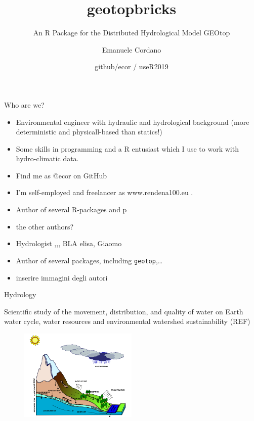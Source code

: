 \documentclass[ignorenonframetext,]{beamer}
\title{geotopbricks}
\subtitle{An R Package for the Distributed Hydrological Model GEOtop}
\author{Emanuele Cordano}
\date{github/ecor / useR2019}
\providecommand{\tightlist}{%
  \setlength{\itemsep}{0pt}\setlength{\parskip}{0pt}}
\begin{document}
\frame{\titlepage}

\begin{frame}[fragile]{Who are we?}

\begin{itemize}
\tightlist
\item
  Environmental engineer with hydraulic and hydrological background
  (more deterministic and physicall-based than statics!)
\item
  Some skills in programming and a R entusiast which I use to work with
  hydro-climatic data.
\item
  Find me as @ecor on GitHub
\item
  I'm self-employed and freelancer as www.rendena100.eu .\\
\item
  Author of several R-packages and p
\item
  the other authors?
\item
  Hydrologist ,,, BLA elisa, Giaomo
\item
  Author of several packages, including \texttt{geotop},\ldots{}
\item
  inserire immagini degli autori
\end{itemize}

\end{frame}

\begin{frame}{Hydrology}

Scientific study of the movement, distribution, and quality of water on
Earth water cycle, water resources and environmental watershed
sustainability (REF)

\begin{figure}
\centering
\includegraphics[width=0.50000\textwidth]{resources/images/geotop_landscape.png}
\caption{}
\end{figure}

\end{frame}
\end{document}
